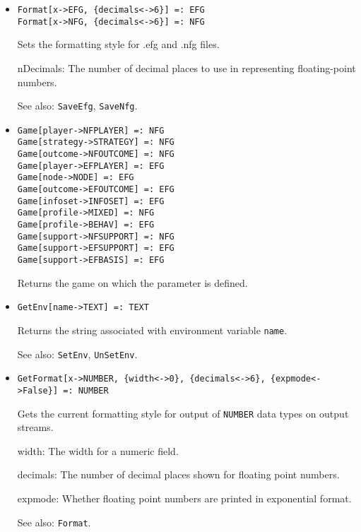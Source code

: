 \begin{itemize}
\item{}
\protect \large \begin{verbatim}
Format[x->EFG, {decimals<->6}] =: EFG
Format[x->NFG, {decimals<->6}] =: NFG
\end{verbatim} \normalsize

\bd
Sets the formatting style for .efg and .nfg files.
\bd
\item [nDecimals:] The number of decimal places to use in representing
floating-point numbers.
\ed
\item [See also:] \verb+SaveEfg+, \verb+SaveNfg+.
\ed



\item{}
\protect \large \begin{verbatim}
Game[player->NFPLAYER] =: NFG 
Game[strategy->STRATEGY] =: NFG 
Game[outcome->NFOUTCOME] =: NFG 
Game[player->EFPLAYER] =: EFG 
Game[node->NODE] =: EFG 
Game[outcome->EFOUTCOME] =: EFG 
Game[infoset->INFOSET] =: EFG 
Game[profile->MIXED] =: NFG 
Game[profile->BEHAV] =: EFG 
Game[support->NFSUPPORT] =: NFG 
Game[support->EFSUPPORT] =: EFG 
Game[support->EFBASIS] =: EFG 
\end{verbatim} \normalsize

\bd
Returns the game on which the parameter is defined.
\ed

\item{}
\protect \large \begin{verbatim}
GetEnv[name->TEXT] =: TEXT 
\end{verbatim} \normalsize

\bd
Returns the string associated with environment variable \verb+name+.
\item [See also:] \verb+SetEnv+, \verb+UnSetEnv+.
\ed


\item{}
\protect \large \begin{verbatim}
GetFormat[x->NUMBER, {width<->0}, {decimals<->6}, {expmode<->False}] =: NUMBER 
\end{verbatim} \normalsize

\bd Gets the current formatting style for output of {\tt NUMBER} data types
on output streams.  
\bd
\item [width:] The width for a numeric field.  
\item [decimals:] The number of decimal places shown for floating point
numbers.
\item [expmode:] Whether floating point numbers are printed in
exponential format.
\ed
\item [See also:] \verb+Format+.
\ed


\end{itemize}
